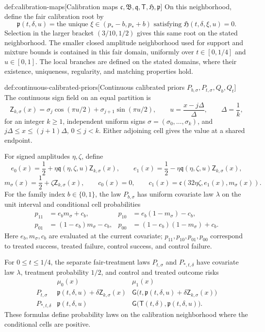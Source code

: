 \documentclass[11pt]{article}
\begin{document}
\begin{definitionv}{def:calibration-maps}[Calibration maps $\mathfrak c,\mathfrak B,\mathfrak q,\mathsf T,\mathfrak H,\mathfrak p$]
On this neighborhood, define the fair calibration root by
\[
\mathfrak p(t,\delta,u)
=
\text{the unique }\xi\in(p_*-b,p_*+b)
\text{ satisfying }\mathfrak H(t,\delta,\xi,u)=0.
\]
Selection in the larger bracket \((3/10,1/2)\) gives this same root on the stated neighborhood. The smaller closed amplitude neighborhood used for support and mixture bounds is contained in this fair domain, uniformly over \(t\in[0,1/4]\) and \(u\in[0,1]\). The local branches are defined on the stated domains, where their existence, uniqueness, regularity, and matching properties hold.
\end{definitionv}

\begin{definitionv}{def:continuous-calibrated-priors}[Continuous calibrated priors \(P_{b,\sigma},P_{t,\sigma},Q_b,Q_t\)]
The continuous sign field on an equal partition is
\[
\mathsf Z_{k,\sigma}(x)
=
\sigma_j\cos(\pi u/2)+\sigma_{j+1}\sin(\pi u/2),
\qquad
u=\frac{x-j\Delta}{\Delta},
\qquad
\Delta=\frac1k,
\]
for an integer \(k\ge1\), independent uniform signs
\(\sigma=(\sigma_0,\ldots,\sigma_k)\), and
\(j\Delta\le x\le(j+1)\Delta\), \(0\le j<k\). Either adjoining cell gives the value at a shared endpoint.

For signed amplitudes \(\eta,\zeta\), define
\[
e_0(x)=\frac12+\eta\mathfrak q(\eta,\zeta,u)\mathsf Z_{k,\sigma}(x),
\qquad
e_1(x)=\frac12-\eta\mathfrak q(\eta,\zeta,u)\mathsf Z_{k,\sigma}(x),
\]
\[
m_\sigma(x)=\frac12+\zeta\mathsf Z_{k,\sigma}(x),
\qquad
c_0(x)=0,
\qquad
c_1(x)=\mathfrak c(32\eta\zeta,e_1(x),m_\sigma(x)).
\]
For the family index \(b\in\{0,1\}\), the law \(P_{b,\sigma}\) has uniform covariate law \(\lambda\) on the unit interval and conditional cell probabilities
\[
\begin{aligned}
p_{11}&=e_bm_\sigma+c_b,
&
p_{10}&=e_b(1-m_\sigma)-c_b,\\
p_{01}&=(1-e_b)m_\sigma-c_b,
&
p_{00}&=(1-e_b)(1-m_\sigma)+c_b.
\end{aligned}
\]
Here \(e_b,m_\sigma,c_b\) are evaluated at the current covariate; \(p_{11},p_{10},p_{01},p_{00}\) correspond to treated success, treated failure, control success, and control failure.

For \(0\le t\le1/4\), the separate fair-treatment laws \(P_{t,\sigma}\) and \(P_{*,t,\delta}\) have covariate law \(\lambda\), treatment probability \(1/2\), and control and treated outcome risks
\[
\begin{array}{c|cc}
&\mu_0(x)&\mu_1(x)\\ \hline
P_{t,\sigma}
&
\mathfrak p(t,\delta,u)+\delta\mathsf Z_{k,\sigma}(x)
&
\mathsf G\bigl(t,\mathfrak p(t,\delta,u)+\delta\mathsf Z_{k,\sigma}(x)\bigr)
\\
P_{*,t,\delta}
&
\mathfrak p(t,\delta,u)
&
\mathsf G\bigl(\mathsf T(t,\delta),\mathfrak p(t,\delta,u)\bigr).
\end{array}
\]
These formulas define probability laws on the calibration neighborhood where the conditional cells are positive.


\end{definitionv}
\end{document}
